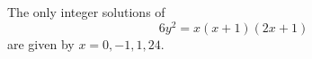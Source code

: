 \begin{proposition}\label{eq:063}
    The only integer solutions of
\[
    6y^2=x(x+1)(2x+1)
\]
    are given by $x=0,-1,1,24$.
\end{proposition}
